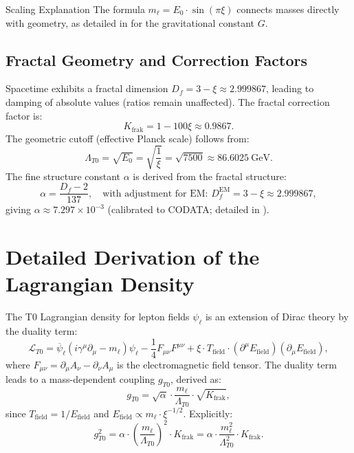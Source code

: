 \documentclass[12pt,a4paper]{article}
\begin{document}
	\begin{explanation}{Scaling Explanation}
		The formula $m_\ell = E_0 \cdot \sin(\pi \xi)$ connects masses directly with geometry, as detailed in \cite{T0_Gravitationskonstante} for the gravitational constant $G$.
	\end{explanation}
	
	\subsection{Fractal Geometry and Correction Factors}
	Spacetime exhibits a fractal dimension $D_f = 3 - \xi \approx 2.999867$, leading to damping of absolute values (ratios remain unaffected). The fractal correction factor is:
	\begin{equation}
		K_\text{frak} = 1 - 100 \xi \approx 0.9867.
	\end{equation}
	The geometric cutoff (effective Planck scale) follows from:
	\begin{equation}
		\Lambda_{T0} = \sqrt{E_0} = \sqrt{\frac{1}{\xi}} = \sqrt{7500} \approx \SI{86.6025}{\giga\electronvolt}.
	\end{equation}
	The fine structure constant $\alpha$ is derived from the fractal structure:
	\begin{equation}
		\alpha = \frac{D_f - 2}{137}, \quad \text{with adjustment for EM: } D_f^\text{EM} = 3 - \xi \approx 2.999867,
	\end{equation}
	giving $\alpha \approx 7.297 \times 10^{-3}$ (calibrated to CODATA; detailed in \cite{T0_FineStructure}).
	
	\section{Detailed Derivation of the Lagrangian Density}
	The T0 Lagrangian density for lepton fields $\psi_\ell$ is an extension of Dirac theory by the duality term:
	\begin{equation}
		\mathcal{L}_{T0} = \overline{\psi}_\ell (i \gamma^\mu \partial_\mu - m_\ell) \psi_\ell - \frac{1}{4} F_{\mu\nu} F^{\mu\nu} + \xi \cdot T_\text{field} \cdot (\partial^\mu E_\text{field}) (\partial_\mu E_\text{field}),
	\end{equation}
	where $F_{\mu\nu} = \partial_\mu A_\nu - \partial_\nu A_\mu$ is the electromagnetic field tensor. The duality term leads to a mass-dependent coupling $g_{T0}$, derived as:
	\begin{equation}
		g_{T0} = \sqrt{\alpha} \cdot \frac{m_\ell}{\Lambda_{T0}} \cdot \sqrt{K_\text{frak}},
	\end{equation}
	since $T_\text{field} = 1 / E_\text{field}$ and $E_\text{field} \propto m_\ell \cdot \xi^{-1/2}$. Explicitly:
	\begin{equation}
		g_{T0}^2 = \alpha \cdot \left( \frac{m_\ell}{\Lambda_{T0}} \right)^2 \cdot K_\text{frak} = \alpha \cdot \frac{m_\ell^2}{\Lambda_{T0}^2} \cdot K_\text{frak}.
	\end{equation}
	
\end{document}
